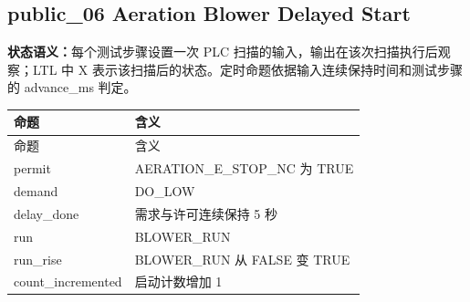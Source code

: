 \subsection{{\ttfamily public\_06} Aeration Blower Delayed Start}

\noindent\textbf{状态语义：}每个测试步骤设置一次 PLC 扫描的输入，输出在该次扫描执行后观察；LTL 中 X 表示该扫描后的状态。定时命题依据输入连续保持时间和测试步骤的 advance\_ms 判定。

\begin{longtable}{L{3.3cm}L{10.0cm}}

\toprule

命题 & 含义\\

\midrule

\endfirsthead

\toprule

命题 & 含义\\

\midrule

\endhead

{\ttfamily permit} & AERATION\_E\_STOP\_NC 为 TRUE\\

{\ttfamily demand} & DO\_LOW\\

{\ttfamily delay\_done} & 需求与许可连续保持 5 秒\\

{\ttfamily run} & BLOWER\_RUN\\

{\ttfamily run\_rise} & BLOWER\_RUN 从 FALSE 变 TRUE\\

{\ttfamily count\_incremented} & 启动计数增加 1\\

\bottomrule

\end{longtable}

